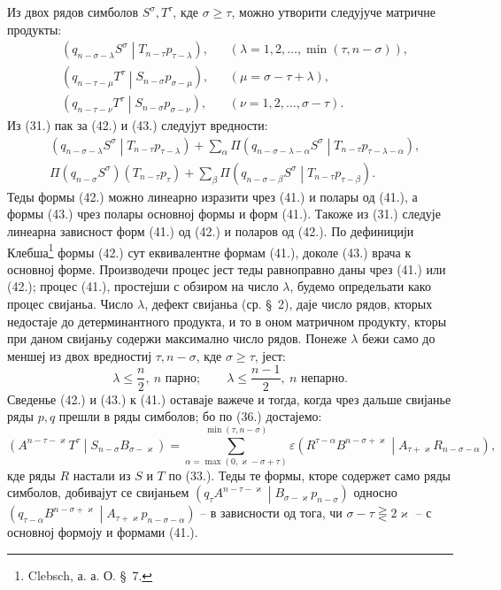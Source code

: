 ﻿\documentclass[11pt]{article}
\newcommand{\pair}[2]{\left(#1\middle|#2\right)}
\newcommand{\eps}{\varepsilon}
\begin{document}
Из двох рядов симболов $S^\sigma,T^\tau$, кде $\sigma\ge\tau$, можно утворити следујуче матричне продукты:
\begin{align}
&\pair{q_{n-\sigma-\lambda}S^\sigma}{T_{n-\tau}p_{\tau-\lambda}},
&&(\lambda=1,2,\ldots,\min(\tau,n-\sigma)),\tag{41}\\
&\pair{q_{n-\tau-\mu}T^\tau}{S_{n-\sigma}p_{\sigma-\mu}},
&&(\mu=\sigma-\tau+\lambda),\tag{42}\\
&\pair{q_{n-\tau-\nu}T^\tau}{S_{n-\sigma}p_{\sigma-\nu}},
&&(\nu=1,2,\ldots,\sigma-\tau).
\tag{43}
\end{align}
Из (31.) пак за (42.) и (43.) следујут вредности:
\begin{align}
&\pair{q_{n-\sigma-\lambda}S^\sigma}{T_{n-\tau}p_{\tau-\lambda}}
 +\sum_{\alpha}\Pi
 \pair{q_{n-\sigma-\lambda-\alpha}S^\sigma}
 {T_{n-\tau}p_{\tau-\lambda-\alpha}},\tag{42a}\\
&\Pi(q_{n-\sigma}S^\sigma)(T_{n-\tau}p_\tau)
 +\sum_{\beta}\Pi
 \pair{q_{n-\sigma-\beta}S^\sigma}{T_{n-\tau}p_{\tau-\beta}}.
\tag{43a}
\end{align}
Теды формы (42.) можно линеарно изразити чрез (41.) и полары од (41.), а формы (43.) чрез полары основној формы и форм (41.). Такоже из (31.) следује линеарна зависност форм (41.) од (42.) и поларов од (42.). По дефиницији Клебша\footnote{Clebsch, а. а. О. \S\ 7.} формы (42.) сут еквивалентне формам (41.), доколе (43.) врача к основној форме. Производечи процес јест теды равноправно даны чрез (41.) или (42.); процес (41.), простејши с обзиром на число $\lambda$, будемо определьати како процес свијаньа. Число $\lambda$, дефект свијаньа (ср. \S\ 2), даје число рядов, кторых недостаје до детерминантного продукта, и то в оном матричном продукту, кторы при даном свијаньу содержи максимално число рядов. Понеже $\lambda$ бежи само до меншеј из двох вредностиј $\tau,n-\sigma$, кде $\sigma\ge\tau$, јест:
\begin{equation}
 \lambda\le\frac n2,\ n\text{ парно};\qquad
 \lambda\le\frac{n-1}{2},\ n\text{ непарно}.
\tag{44}
\end{equation}
Сведенье (42.) и (43.) к (41.) оставаје важече и тогда, когда чрез дальше свијанье ряды $p,q$ прешли в ряды симболов; бо по (36.) достајемо:
\[
 \pair{A^{n-\tau-\varkappa}T^\tau}{S_{n-\sigma}B_{\sigma-\varkappa}}
 =\sum_{\alpha=\max(0,\varkappa-\sigma+\tau)}^{\min(\tau,n-\sigma)}
 \eps\pair{R^{\tau-\alpha}B^{n-\sigma+\varkappa}}
 {A_{\tau+\varkappa}R_{n-\sigma-\alpha}},
\]
кде ряды $R$ настали из $S$ и $T$ по (33.). Теды те формы, кторе содержет само ряды симболов, добивајут се свијаньем $\pair{q_\tau A^{n-\tau-\varkappa}}{B_{\sigma-\varkappa}p_{n-\sigma}}$ односно $\pair{q_{\tau-\alpha}B^{n-\sigma+\varkappa}}{A_{\tau+\varkappa}p_{n-\sigma-\alpha}}$ -- в зависности од тога, чи $\sigma-\tau\gtreqless 2\varkappa$ -- с основној формоју и формами (41.).
\end{document}
